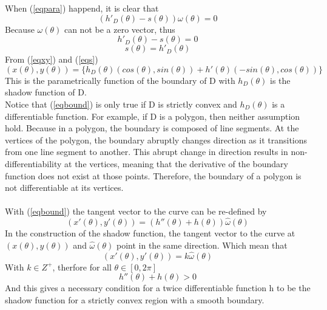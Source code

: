 \documentclass[a4paper]{article}
\begin{document}
When (\ref{eqpara}) happend, it is clear that 
\begin{equation*}
    (h'_D(\theta) - s(\theta))\omega(\theta) = 0
\end{equation*}
Because $\omega(\theta)$ can not be a zero vector, thus
\begin{equation*}
    h'_D(\theta) - s(\theta) = 0
\end{equation*}
\begin{equation}\label{eqs}
    s(\theta) = h'_D(\theta) 
\end{equation}
From (\ref{eqxy}) and (\ref{eqs})
\begin{equation}\label{eqbound}
    (x(\theta),y(\theta)) = \{h_D(\theta)(cos(\theta),sin(\theta)) + h'(\theta)(-sin(\theta),cos(\theta))\}
\end{equation}
This is the parametrically function of the boundary of D with $h_D(\theta)$ is the shadow function of D.\\

\noindent Notice that (\ref{eqbound}) is only true if D is strictly convex and $h_D(\theta)$ is a differentiable function. For example, if D is a polygon, then neither assumption hold. Because in a polygon, the boundary is composed of line segments. At the vertices of the polygon, the boundary abruptly changes direction as it transitions from one line segment to another. This abrupt change in direction results in non-differentiability at the vertices, meaning that the derivative of the boundary function does not exist at those points. Therefore, the boundary of a polygon is not differentiable at its vertices.\\ \\
With (\ref{eqbound}) the tangent vector to the curve can be re-defined by
\begin{equation*}
    (x'(\theta),y'(\theta)) = (h''(\theta) + h(\theta))\hat{\omega}(\theta)
\end{equation*}
In the construction of the shadow function, the tangent vector to the curve at $(x(\theta),y(\theta))$ and $\hat{\omega}(\theta)$ point in the same direction. Which mean that
\begin{equation*}
    (x'(\theta),y'(\theta)) = k \hat{\omega}(\theta)
\end{equation*}
With $k \in Z^+$, therfore for all $\theta \in [0,2\pi]$
\begin{equation}\label{seconddiff}
    h''(\theta) + h(\theta) > 0
\end{equation}
And this gives a necessary condition for a twice differentiable function h to be the shadow function for a strictly convex region with a smooth boundary. 
\end{document}
